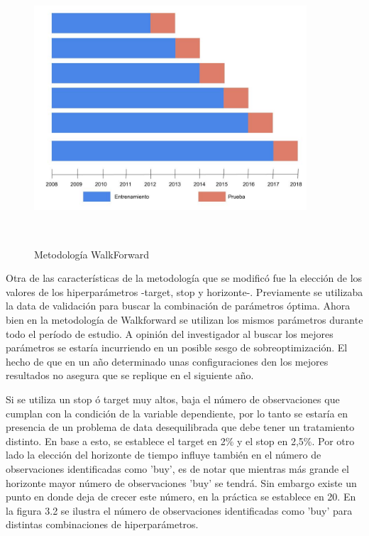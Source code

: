 \documentclass[a4paper,12pt]{Latex/Classes/PhDthesisPSnPDF}
\begin{document}
\begin{figure}[ht]
\begin{center}
\includegraphics[width=4in, height=4in]{images/walkforward_plot}
\end{center}
\caption{Metodología WalkForward}
\end{figure}

Otra de las características de la metodología que se modificó fue la elección de los valores de los hiperparámetros -target, stop y horizonte-. Previamente se utilizaba la data de validación para buscar la combinación de parámetros óptima. Ahora bien en la metodología de Walkforward se utilizan los mismos parámetros durante todo el período de estudio. A opinión del investigador al buscar los mejores parámetros se estaría incurriendo en un posible sesgo de sobreoptimización. El hecho de que en un año determinado unas configuraciones den los mejores resultados no asegura que se replique en el siguiente año.

Si se utiliza un stop ó target muy altos, baja el número de observaciones que cumplan con la condición de la variable dependiente, por lo tanto se estaría en presencia de un problema de data desequilibrada que debe tener un tratamiento distinto. En base a esto, se establece el target en 2\% y el stop en 2,5\%. Por otro lado la elección del horizonte de tiempo influye también en el número de observaciones identificadas como 'buy', es de notar que mientras más grande el horizonte mayor número de observaciones 'buy' se tendrá. Sin embargo existe un punto en donde deja de crecer este número, en la práctica se establece en 20. En la figura 3.2 se ilustra el número de observaciones identificadas como 'buy' para distintas combinaciones de hiperparámetros.
\end{document}
